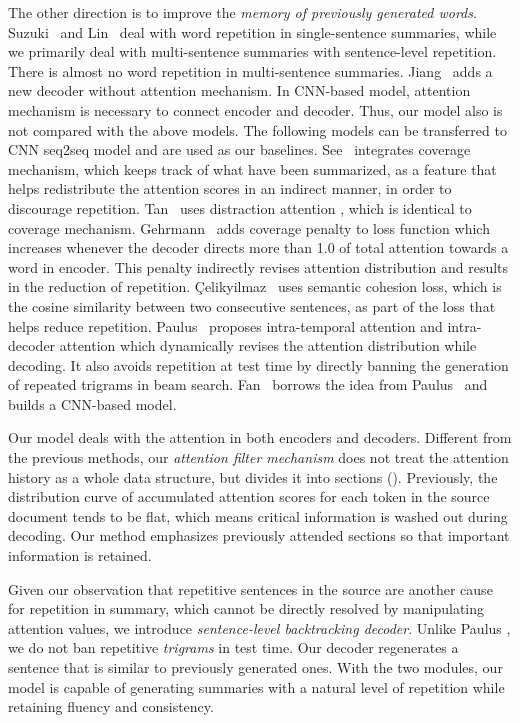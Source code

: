 The other direction is to improve the 
{\em memory of previously generated words}.
Suzuki~\cite{SuzukiN17} and Lin~\cite{LinSMS18} 
deal with word repetition in single-sentence summaries, 
while we primarily deal with multi-sentence summaries with 
sentence-level repetition. 
There is almost no word repetition in multi-sentence summaries.
Jiang~\cite{JiangB18} adds a new decoder without attention mechanism.
In CNN-based model, attention mechanism is necessary to connect encoder 
and decoder.
Thus, our model also is not compared with the above models. 
The following models can be transferred to CNN seq2seq model and
are used as our baselines.
See~\cite{SeeLM17} integrates coverage mechanism, 
which keeps track of what have been summarized, as a feature that helps 
redistribute the attention scores in an indirect manner,
in order to discourage repetition. 
Tan~\cite{TanWX17} uses distraction attention
\cite{ChenZLWJ16}, which is identical to coverage mechanism. 
Gehrmann~\cite{GehrmannDR18} adds coverage penalty to loss function
which increases whenever the decoder directs more than 1.0 of total attention
towards a word in encoder.
This penalty indirectly revises attention distribution and results in
the reduction of repetition.
{\c{C}}elikyilmaz~\cite{elikyilmazBHC18} uses semantic cohesion loss,
which is the cosine similarity between two consecutive sentences, as part of
the loss that helps reduce repetition.
Paulus~\cite{PaulusXS17} proposes intra-temporal attention \cite{NallapatiZSGX16} and 
intra-decoder attention which dynamically revises the attention distribution while decoding. 
It also avoids repetition at test time by directly banning the generation of 
repeated trigrams in beam search. 
Fan~\cite{FanGA18} borrows the idea from Paulus~\cite{PaulusXS17} and 
builds a CNN-based model. 

Our model deals with the attention in both encoders and decoders. 
Different from the previous methods, 
our \textit{attention filter mechanism} does not 
treat the attention history as a whole data structure,  
but divides it into sections (). 
Previously, the distribution curve of accumulated attention scores 
for each token in the source document tends to be flat, 
which means critical information is washed out during decoding.
Our method emphasizes previously attended sections 
so that important information is retained.

Given our observation that repetitive sentences in the source are
another cause for repetition in summary, 
which cannot be directly resolved by manipulating attention values, 
we introduce \textit{sentence-level backtracking decoder}. 
Unlike Paulus \cite{PaulusXS17}, 
we do not ban repetitive \textit{trigrams} in test time. 
Our decoder regenerates a sentence that is similar to previously generated ones.
With the two modules, our model is capable of generating summaries with a
natural level of repetition while retaining fluency and consistency.
